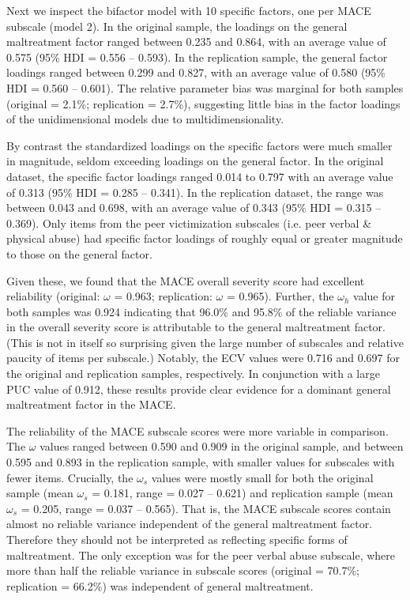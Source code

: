 \documentclass[letterpaper,man,natbib]{apa6}  %
\begin{document}
Next we inspect the bifactor model with 10 specific factors, one per MACE subscale (model 2). In the original sample, the loadings on the general maltreatment factor ranged between 0.235 and 0.864, with an average value of 0.575 (95\% HDI = 0.556 -- 0.593). In the replication sample, the general factor loadings ranged between 0.299 and 0.827, with an average value of 0.580 (95\% HDI = 0.560 -- 0.601). The relative parameter bias was marginal for both samples (original = 2.1\%; replication = 2.7\%), suggesting little bias in the factor loadings of the unidimensional models due to multidimensionality.  

By contrast the standardized loadings on the specific factors were much smaller in magnitude, seldom exceeding loadings on the general factor. In the original dataset, the specific factor loadings ranged 0.014 to 0.797 with an average value of 0.313 (95\% HDI = 0.285 -- 0.341). In the replication dataset, the range was between 0.043 and 0.698, with an average value of 0.343 (95\% HDI = 0.315 -- 0.369). Only items from the peer victimization subscales (i.e. peer verbal \& physical abuse) had specific factor loadings of roughly equal or greater magnitude to those on the general factor. 

Given these, we found that the MACE overall severity score had excellent reliability (original: $\omega$ = 0.963; replication: $\omega$ = 0.965). Further, the $\omega_h$ value for both samples was 0.924 indicating that 96.0\% and 95.8\% of the reliable variance in the overall severity score is attributable to the general maltreatment factor. (This is not in itself so surprising given the large number of subscales and relative paucity of items per subscale.) Notably, the ECV values were 0.716 and 0.697 for the original and replication samples, respectively. In conjunction with a large PUC value of 0.912, these results provide clear evidence for a dominant general maltreatment factor in the MACE. 

The reliability of the MACE subscale scores were more variable in comparison. The $\omega$ values ranged between 0.590 and 0.909 in the original sample, and between 0.595 and 0.893 in the replication sample, with smaller values for subscales with fewer items. Crucially, the $\omega_s$ values were mostly small for both the original sample (mean $\omega_s$ = 0.181, range = 0.027 -- 0.621) and replication sample (mean $\omega_s$ = 0.205, range = 0.037 -- 0.565). That is, the MACE subscale scores contain almost no reliable variance independent of the general maltreatment factor. Therefore they should not be interpreted as reflecting specific forms of maltreatment. The only exception was for the peer verbal abuse subscale, where more than half the reliable variance in subscale scores (original = 70.7\%; replication = 66.2\%) was independent of general maltreatment.
\end{document}
